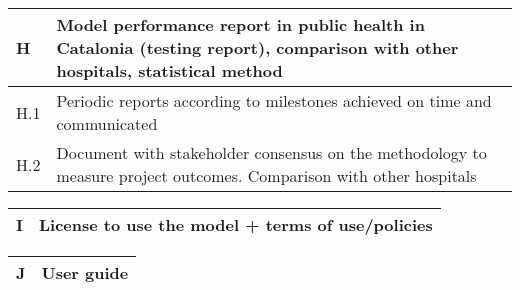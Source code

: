 \begin{center}
    \vspace{1em}
    \begin{tabular}{| >{\raggedright\arraybackslash}p{1cm}  | >{\raggedright\arraybackslash}p{13cm} |}
        \hline
        \rowcolor[HTML]{DCDCDC} H & Model performance report in public health in Catalonia (testing report), comparison with other hospitals, statistical method \\ \hline
        H.1                       & Periodic reports according to milestones achieved on time and communicated                                                   \\ \hline
        H.2                       & Document with stakeholder consensus on the methodology to measure project outcomes. Comparison with other hospitals          \\ \hline
    \end{tabular}

    \vspace{1em}
    \begin{tabular}{| >{\raggedright\arraybackslash}p{1cm}  | >{\raggedright\arraybackslash}p{13cm} |}
        \hline
        \rowcolor[HTML]{DCDCDC} I & License to use the model + terms of use/policies \\ \hline
    \end{tabular}

    \vspace{1em}
    \begin{tabular}{| >{\raggedright\arraybackslash}p{1cm}  | >{\raggedright\arraybackslash}p{13cm} |}
        \hline
        \rowcolor[HTML]{DCDCDC} J & User guide \\ \hline
    \end{tabular}
\end{center}
